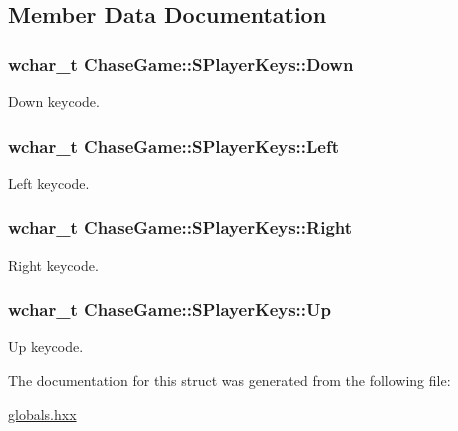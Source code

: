 \subsection{Member Data Documentation}
\hypertarget{struct_chase_game_1_1_s_player_keys_abe56af951c133c98b24401542f28ec9b}{
\subsubsection[{Down}]{\setlength{\rightskip}{0pt plus 5cm}wchar\-\_\-t Chase\-Game\-::\-S\-Player\-Keys\-::\-Down}}\label{struct_chase_game_1_1_s_player_keys_abe56af951c133c98b24401542f28ec9b}


Down keycode. 

\hypertarget{struct_chase_game_1_1_s_player_keys_ab6c4f7e03fa43cd9443dcbd16a5e3250}{
\subsubsection[{Left}]{\setlength{\rightskip}{0pt plus 5cm}wchar\-\_\-t Chase\-Game\-::\-S\-Player\-Keys\-::\-Left}}\label{struct_chase_game_1_1_s_player_keys_ab6c4f7e03fa43cd9443dcbd16a5e3250}


Left keycode. 

\hypertarget{struct_chase_game_1_1_s_player_keys_a17ec0fea68ec78ad4577c6b56b83fa15}{
\subsubsection[{Right}]{\setlength{\rightskip}{0pt plus 5cm}wchar\-\_\-t Chase\-Game\-::\-S\-Player\-Keys\-::\-Right}}\label{struct_chase_game_1_1_s_player_keys_a17ec0fea68ec78ad4577c6b56b83fa15}


Right keycode. 

\hypertarget{struct_chase_game_1_1_s_player_keys_a0153d90bee31d3959e7a79377c4dd927}{
\subsubsection[{Up}]{\setlength{\rightskip}{0pt plus 5cm}wchar\-\_\-t Chase\-Game\-::\-S\-Player\-Keys\-::\-Up}}\label{struct_chase_game_1_1_s_player_keys_a0153d90bee31d3959e7a79377c4dd927}


Up keycode. 



The documentation for this struct was generated from the following file\-:\begin{DoxyCompactItemize}
\item 
\hyperlink{globals_8hxx}{globals.\-hxx}\end{DoxyCompactItemize}
